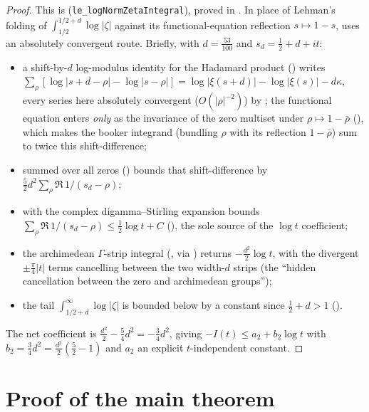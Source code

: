 \begin{proof}
\leanok
{}
This is  (\texttt{le\_logNormZetaIntegral}), proved in
. In place of Lehman's folding of
$\int_{1/2}^{1/2+d}\log|\zeta|$ against its functional-equation reflection
$s\mapsto1-s$,  uses an absolutely convergent route.
Briefly, with $d=\tfrac{53}{100}$ and
$s_d=\tfrac12+d+it$:
\begin{itemize}
  \item a shift-by-$d$ log-modulus identity for the Hadamard product
        () writes
        $\sum_\rho[\log|s+d-\rho|-\log|s-\rho|]=\log|\xi(s+d)|-\log|\xi(s)|-d\kappa$,
        every series here absolutely convergent ($O(|\rho|^{-2})$) by
        ; the functional equation enters \emph{only} as the
        invariance of the zero multiset under $\rho\mapsto1-\bar\rho$
        (), which makes the booker integrand (bundling $\rho$
        with its reflection $1-\bar\rho$) sum to twice this shift-difference;
  \item {} summed over all zeros () bounds
        that shift-difference by $\tfrac52 d^2\sum_\rho\Re\,1/(s_d-\rho)$;
  \item {} with the complex digamma--Stirling expansion bounds
        $\sum_\rho\Re\,1/(s_d-\rho)\le\tfrac12\log t+C$ (), the
        sole source of the $\log t$ coefficient;
  \item the archimedean $\Gamma$-strip integral (, via
        ) returns $-\tfrac{d^2}2\log t$, with the divergent
        $\pm\tfrac\pi4|t|$ terms cancelling between the two width-$d$ strips (the
        ``hidden cancellation between the zero and archimedean groups'');
  \item the tail $\int_{1/2+d}^\infty\log|\zeta|$ is bounded below by a constant since
        $\tfrac12+d>1$ ().
\end{itemize}
The net coefficient is $\tfrac{d^2}2-\tfrac54 d^2=-\tfrac34 d^2$, giving
$-I(t)\le a_2+b_2\log t$ with $b_2=\tfrac34 d^2=\tfrac{d^2}2(\tfrac52-1)$ and $a_2$ an
explicit $t$-independent constant.
\end{proof}

\section{Proof of the main theorem}
\label{sec:lb_proof}


